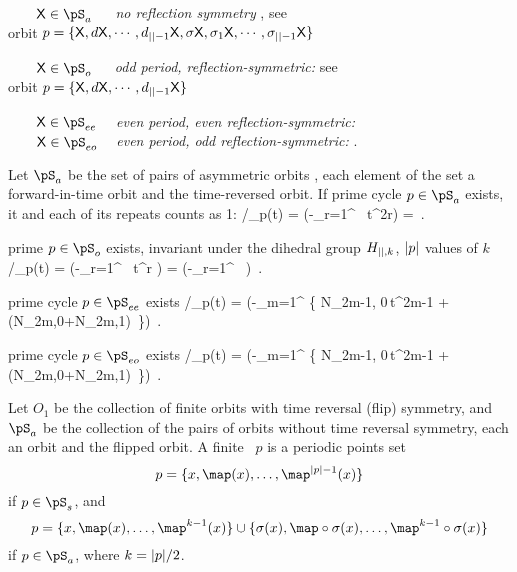 \noindent
$\qquad \Xx\in\pS_{a}\quad\;$
    {\em no reflection symmetry} ,
                                 see 
\\ \qquad\qquad\qquad
orbit $p=\{\mathsf{X}, d\mathsf{X}, \cdots, d_{{||}-1}\mathsf{X},
       \sigma\mathsf{X}, \sigma_1\mathsf{X}, \cdots, \sigma_{{||}-1}\mathsf{X}\}$

\noindent
$\qquad \Xx\in\pS_{o}\quad\;$
    {\em odd period, reflection-symmetric:} 
                                            see 
\\ \qquad\qquad\qquad
orbit $p=\{\mathsf{X}, d\mathsf{X}, \cdots, d_{{||}-1}\mathsf{X}\}$

\noindent
$\qquad \Xx\in\pS_{ee}\quad$
    {\em even period, even reflection-symmetric:} 
\\

\noindent
$\qquad \Xx\in\pS_{eo}\quad$
    {\em even period, odd reflection-symmetric:} .

Let $\pS_{a}$ be the set of pairs of asymmetric orbits
 , each element of
the set a forward-in-time orbit and the time-reversed orbit.
If prime cycle $p \in \pS_{a}$ exists, it and each of its repeats counts
as 1:
/\zeta_{p}(t) =
\exp \Big(-\sum_{r=1}^{\infty} \, t^{2r}\Big)
    =
\,.

prime {\lattstate} $p \in \pS_{o}$ exists,
{\lattstate} invariant under the dihedral group $H_{{||},k}$, ${|p|}$
values of $k$
/\zeta_{p}(t) =
\exp \Big(-\sum_{r=1}^{\infty} \,
                     t^{r}
      \Big) =
\exp \Big(-\sum_{r=1}^{\infty} \,
      \Big)
\,.

prime cycle $p \in \pS_{ee}$ exists
/\zeta_{p}(t) =
\exp \Big(-\sum_{m=1}^{\infty} \left\{
       N_{2m-1, 0}\,t^{2m-1}
       + \left(N_{2m,0}+N_{2m,1}\right)\,
                               \right\}\Big)
\,.

prime cycle $p \in \pS_{eo}$ exists
/\zeta_{p}(t) =
\exp \Big(-\sum_{m=1}^{\infty} \left\{
       N_{2m-1, 0}\,t^{2m-1}
       + \left(N_{2m,0}+N_{2m,1}\right)\,
                               \right\}\Big)
\,.



Let $O_1$ be the collection of finite orbits with time
reversal (flip) symmetry, and $\pS_{a}$ be the collection of the pairs of
orbits without time reversal symmetry, each an orbit and the flipped
orbit. A finite \orbit\ $p$ is a periodic points set
\[
p = \{\ssp, \map(\ssp), \dots, \map^{\cl{p}-1}(\ssp)\}
\]
if $p \in \pS_{s}$, and
\[
p = \{\ssp, \map(\ssp), \dots, \map^{k-1}(\ssp)\} \cup
\{\Refl(\ssp), \map\circ\Refl(\ssp), \dots, \map^{k-1}\circ\Refl(\ssp)\}
\]
if $p \in \pS_{a}$, where $k={|p|}/2$.

